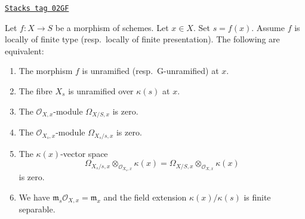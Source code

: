 \begin{lemma}
\label{morphisms-lemma-unramified-at-point}
\href{https://stacks.math.columbia.edu/tag/02GF}{\texttt{Stacks tag 02GF}}

Let $f : X \to S$ be a morphism of schemes.
Let $x \in X$.
Set $s = f(x)$.
Assume $f$ is locally of finite type (resp.\ locally of finite presentation).
The following are equivalent:
\begin{enumerate}
\item The morphism $f$ is unramified (resp.\ G-unramified) at $x$.
\item The fibre $X_s$ is unramified over $\kappa(s)$ at $x$.
\item The $\mathcal{O}_{X, x}$-module $\Omega_{X/S, x}$ is zero.
\item The $\mathcal{O}_{X_s, x}$-module $\Omega_{X_s/s, x}$ is zero.
\item The $\kappa(x)$-vector space
$$
\Omega_{X_s/s, x} \otimes_{\mathcal{O}_{X_s, x}} \kappa(x) =
\Omega_{X/S, x} \otimes_{\mathcal{O}_{X, x}} \kappa(x)
$$
is zero.
\item We have $\mathfrak m_s\mathcal{O}_{X, x} = \mathfrak m_x$
and the field extension $\kappa(x)/\kappa(s)$ is finite
separable.
\end{enumerate}
\end{lemma}

